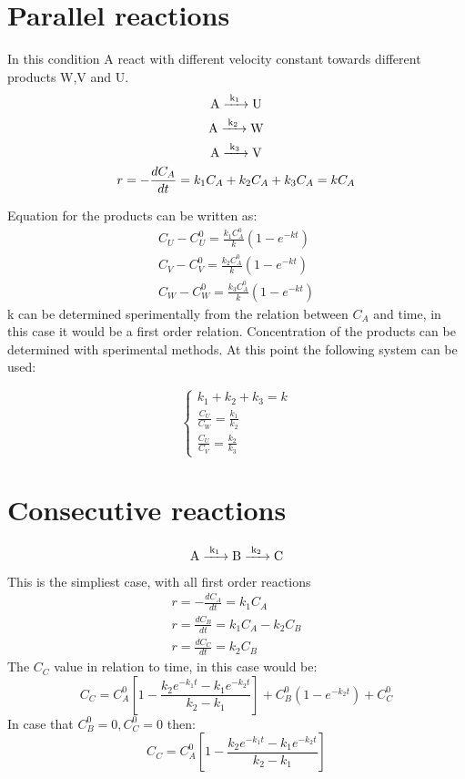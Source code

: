 \documentclass[../Master.tex]{subfiles}
\begin{document}
\begin{multicols*}{2}
		 \section{Parallel reactions}
		  In this condition A react with different velocity constant towards different
		  products W,V and U.
		  \begin{gather*}
				   \ce{ A ->[{k_{1}}] U} \\
				   \ce{ A ->[{k_{2}}] W} \\
				   \ce{ A ->[{k_{3}}] V} \\
				   r =  - \frac{dC_{A} }{dt} = k_{1}C_{A} + k_{2}C_{A} + k_{3}C_{A} = kC_{A}
		  \end{gather*}

		  Equation for the products can be written as:
		  \begin{gather*}
				   C_{U} - C_{U}^{0} = \frac{k_{1}C_{A}^{0}}{k}(1-e^{-kt})\\
				   C_{V} - C_{V}^{0} = \frac{k_{2}C_{A}^{0}}{k}(1-e^{-kt})\\
				   C_{W} - C_{W}^{0} = \frac{k_{3}C_{A}^{0}}{k}(1-e^{-kt})
		  \end{gather*}
		  k can be determined sperimentally from the relation between \( C_{A}  \) and time, in this case it would be a first order relation.
		  Concentration of the products can be determined with sperimental methods. At this point the following system can be used:

		  \begin{equation*}
				   \begin{cases}
						    k_{1} + k_{2} + k_{3} = k                  \\
						    \frac{C_{U}}{C_{W} } = \frac{k_{1}}{k_{2}} \\
						    \frac{C_{U} }{C_{V}} = \frac{k_{2}}{k_{3}}
				   \end{cases}
		  \end{equation*}

		 \section{Consecutive reactions}
		  \begin{gather*}
				   \ce{ A ->[{k_{1}}] B ->[{k_{2}}]C}\\
		  \end{gather*}
		  This is the simpliest case, with all first order reactions
		  \begin{gather*}
				   r = -\frac{dC_{A}}{dt} = k_{1}C_{A}\\
				   r = \frac{dC_{B}}{dt} = k_{1}C_{A} - k_{2}C_{B}\\
				   r = \frac{dC_{C}}{dt} = k_{2}C_{B}
		  \end{gather*}
		  The $C_{C}$ value in relation to time, in this case would be:
		  \[
				   C_{C} = C_{A}^{0}\left[1 -\frac{k_{2}e^{-k_{1}t} -k_{1}e^{-k_{2}t}}{k_{2}-k_{1}} \right] + C_{B}^{0}(1-e^{-k_{2}t})+C_{C}^{0}
		  \]
		  In case that \( C_{B}^0=0, C_{C}^0 = 0 \) then:
		  \[
				   C_{C} = C_{A}^{0}\left[1 -\frac{k_{2}e^{-k_{1}t} -k_{1}e^{-k_{2}t}}{k_{2}-k_{1}} \right]
		  \]

\end{multicols*}
\end{document}
